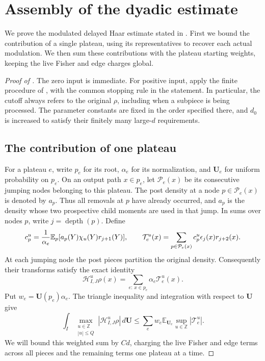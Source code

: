 \section{Assembly of the dyadic estimate}\label{sec:assembly}

We prove the modulated delayed Haar estimate stated in
. First we bound the contribution of a single plateau,
using its representatives to recover each actual modulation. We then sum
these contributions with the plateau starting weights, keeping the
live Fisher and edge charges global.

\begin{proof}[Proof of ]
The zero input is immediate.  For positive input, apply the finite
procedure of , with the common stopping rule in the
statement.  In particular, the cutoff always refers to the original
$\rho$, including when a subpiece is being processed.  The parameter
constants are fixed in the order specified there, and $d_0$ is increased
to satisfy their finitely many large-$d$ requirements.

\subsection*{The contribution of one plateau}

For a plateau $e$, write $p_e$ for its root, $\alpha_e$ for its
normalization, and $\mathbf U_e$ for uniform probability on $p_e$.
On an output path $x\in p_e$, let $\mathcal P_e(x)$ be its consecutive
jumping nodes belonging to this plateau.  The post density at a node
$p\in\mathcal P_e(x)$ is denoted by $a_p$.  Thus all removals at $p$
have already occurred, and $a_p$ is the density whose two prospective
child moments are used in that jump.  In sums over nodes $p$, write
$j=\operatorname{depth}(p)$.  Define
\[
 c_p^u=\frac1{\alpha_e}\mathbb E_p[a_p(Y)\chi_u(Y)r_{j+1}(Y)],
 \qquad
 \mathcal T_e^u(x)=\sum_{p\in\mathcal P_e(x)}
           c_p^u\epsilon_j(x)r_{j+2}(x).
\]
At each jumping node the post pieces partition the original density.
Consequently their transforms satisfy the exact identity
\[
 \mathcal H_{I,J}^{u}\rho(x)
    =\sum_{e:\,x\in p_e}\alpha_e\mathcal T_e^u(x).
\]
Put $w_e=\mathbf U(p_e)\alpha_e$. The triangle inequality and integration
with respect to $\mathbf U$ give
\begin{equation}\label{eq:09-plateau-reduction}
 \int_I\max_{\substack{u\in\mathbb Z\\|u|\le Q}}
       |\mathcal H_{I,J}^{u}\rho|\,d\mathbf U
 \le\sum_e w_e\mathbb E_{\mathbf U_e}
                     \sup_{u\in\mathbb Z}|\mathcal T_e^u|.
\end{equation}
We will bound this weighted sum by $Cd$, charging the live Fisher and
edge terms across all pieces and the remaining terms one plateau at a time.


\end{proof}
